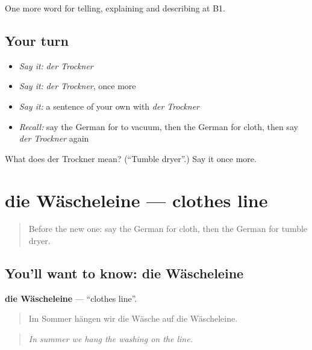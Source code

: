 \begin{grammarlens}[title={What you've built}]
One more word for telling, explaining and describing at B1.
\end{grammarlens}

\subsection*{Your turn}
\begin{itemize}
\raggedright
  \item \emph{Say it:} \emph{der Trockner}
  \item \emph{Say it:} \emph{der Trockner}, once more
  \item \emph{Say it:} a sentence of your own with \emph{der Trockner}
  \item \emph{Recall:} say the German for to vacuum, then the German for cloth, then say \emph{der Trockner} again
\end{itemize}

\begin{tcolorbox}[breakable,colback=teal!4,colframe=teal!35!black,title={Before you move on}]
What does der Trockner mean? (\textquotedblleft{}Tumble dryer\textquotedblright{}.) Say it once more.
\end{tcolorbox}
\section[die Wäscheleine]{die Wäscheleine — clothes line}

\label{lesson:GE-C527-waescheleine}



\begin{quote}
Before the new one: say the German for cloth, then the German for tumble dryer.
\end{quote}

\subsection*{You'll want to know: die Wäscheleine}
\textbf{die Wäscheleine} — \textquotedblleft{}clothes line\textquotedblright{}.

\begin{quote}
Im Sommer hängen wir die Wäsche auf die Wäscheleine.
\end{quote}

\begin{quote}
\emph{In summer we hang the washing on the line.}
\end{quote}

